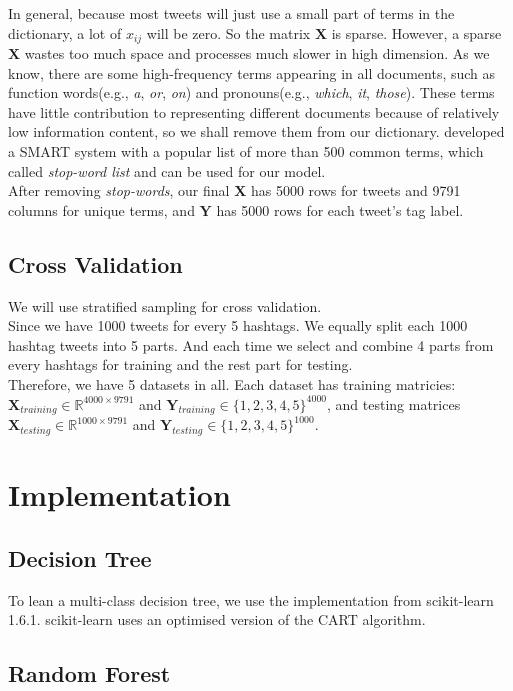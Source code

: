 \documentclass[letterpaper,11pt,twocolumn]{article}
\def\bfY{\mathbf Y}
\def\bfX{\mathbf X}
\def\R{\mathbb R}
\begin{document}
In general, because most tweets will just use a small part of terms in the dictionary, a lot of $x_{ij}$ will be zero. So the matrix $\bfX$ is sparse. However, a sparse $\bfX$ wastes too much space and processes much slower in high dimension. As we know, there are some high-frequency terms appearing in all documents, such as function words(e.g., \emph{a}, \emph{or}, \emph{on}) and pronouns(e.g., \emph{which}, \emph{it}, \emph{those}). These terms have little contribution to representing different documents because of relatively low information content, so we shall remove them from our dictionary. \cite{salton1971smart} developed a SMART system with a popular list of more than 500 common terms, which called \emph{stop-word list} and can be used for our model.\\
After removing \emph{stop-words}, our final $\bfX$ has 5000 rows for tweets and 9791 columns for unique terms, and $\bfY$ has 5000 rows for each tweet's tag label.
\subsection{Cross Validation}
We will use stratified sampling for cross validation.\\
Since we have 1000 tweets for every 5 hashtags. We equally split each 1000 hashtag tweets into 5 parts. And each time we select and combine 4 parts from every hashtags for training and the rest part for testing.\\
Therefore, we have 5 datasets in all. Each dataset has training matricies: $\bfX_{training} \in \R^{4000 \times 9791}$ and $\bfY_{training} \in \{1, 2, 3, 4, 5\}^{4000}$, and testing matrices $\bfX_{testing} \in \R^{1000 \times 9791}$ and $\bfY_{testing} \in \{1, 2, 3, 4, 5\}^{1000}$.

\section{Implementation}
\label{sec:impl}
\subsection{Decision Tree}
To lean a multi-class decision tree, we use the implementation from scikit-learn 1.6.1. scikit-learn uses an optimised version of the CART algorithm.\\
\subsection{Random Forest}
\end{document}
